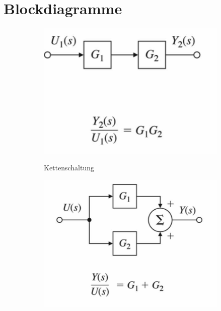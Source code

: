 \section{Blockdiagramme}
\begin{tcolorbox}[colback=white!10!white,colframe=blue!50!black,title=Regeln]
    
    \begin{figure}[H]
        \begin{subfigure}{.3\textwidth}
            \centering
            \includegraphics[width=1\textwidth]{content/img/kettenschaltung}
            \label{fig:kettenschaltung}
            \caption{Kettenschaltung}
        \end{subfigure}%
        \begin{subfigure}{.3\textwidth}
    \centering
    \includegraphics[width=1\textwidth]{content/img/parallel}

\end{subfigure}
\end{figure}
\end{tcolorbox}
